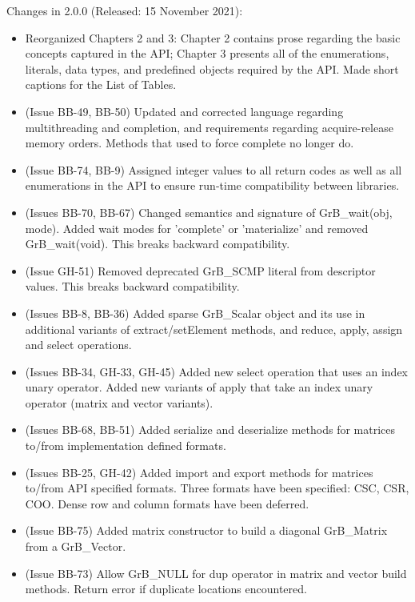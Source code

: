
Changes in 2.0.0 (Released: 15 November 2021):
\begin{itemize}
\item Reorganized Chapters 2 and 3: Chapter 2 contains prose regarding the basic concepts captured in the API; Chapter 3 presents all of the enumerations, literals, data types, and predefined objects required by the API.  Made short captions for the List of Tables.
\item (Issue BB-49, BB-50) Updated and corrected language regarding multithreading and completion, and requirements regarding acquire-release memory orders.  Methods that used to force complete no longer do.
\item (Issue BB-74, BB-9) Assigned integer values to all return codes as well as all enumerations in the API to ensure run-time compatibility between libraries.
\item (Issues BB-70, BB-67) Changed semantics and signature of {\sf GrB\_wait(obj, mode)}. Added wait modes for 'complete' or 'materialize' and removed {\sf GrB\_wait(void)}. {\color{red} This breaks backward compatibility.}
\item (Issue GH-51) Removed deprecated {\sf GrB\_SCMP} literal from descriptor values. {\color{red} This breaks backward compatibility.}
\item (Issues BB-8, BB-36) Added sparse {\sf GrB\_Scalar} object and its use in additional variants of extract/setElement methods, and reduce, apply, assign and select operations.
\item (Issues BB-34, GH-33, GH-45) Added new select operation that uses an index unary operator. Added new variants of apply that take an index unary operator (matrix and vector variants).
\item (Issues BB-68, BB-51) Added serialize and deserialize methods for matrices to/from implementation defined formats.
\item (Issues BB-25, GH-42) Added import and export methods for matrices to/from API specified formats.  Three formats have been specified: CSC, CSR, COO.  Dense row and column formats have been deferred.
\item (Issue BB-75) Added matrix constructor to build a diagonal {\sf GrB\_Matrix} from a {\sf GrB\_Vector}.
\item (Issue BB-73) Allow {\sf GrB\_NULL} for dup operator in matrix and vector {\sf build} methods.  Return error if duplicate locations encountered.

\end{itemize}
